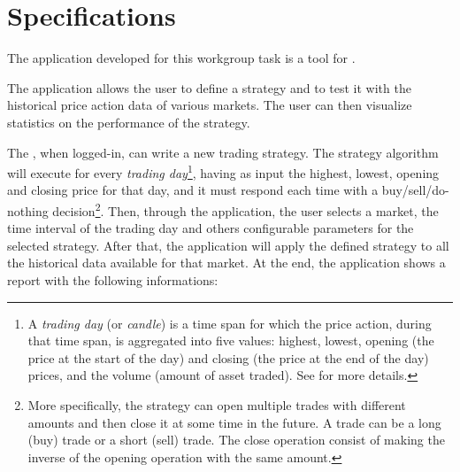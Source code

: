\chapter{Specifications}\label{ch:specs}

The application developed for this workgroup task is a tool for
.

The application allows the user to define a strategy and to test it with the
historical price action data of various markets. The user can then visualize
statistics on the performance of the strategy.

The , when logged-in, can write a new trading strategy. The
strategy algorithm will execute for every \emph{trading day}\footnote{A
\emph{trading day} (or \emph{candle}) is a time span for which the price action,
during that time span, is aggregated into five values: highest, lowest, opening
(the price at the start of the day) and closing (the price at the end of the
day) prices, and the volume (amount of asset traded). See
 for more details.}, having as input the highest,
lowest, opening and closing price for that day, and it must respond each time
with a buy/sell/do-nothing decision\footnote{More specifically, the strategy can
open multiple trades with different amounts and then close it at some time in
the future. A trade can be a long (buy) trade or a short (sell) trade. The
close operation consist of making the inverse of the opening operation with the
same amount.}. Then, through the application, the user selects a market, the
time interval of the trading day and others configurable parameters for the
selected strategy. After that, the application will apply the defined strategy
to all the historical data available for that market. At the end, the
application shows a report with the following informations:
